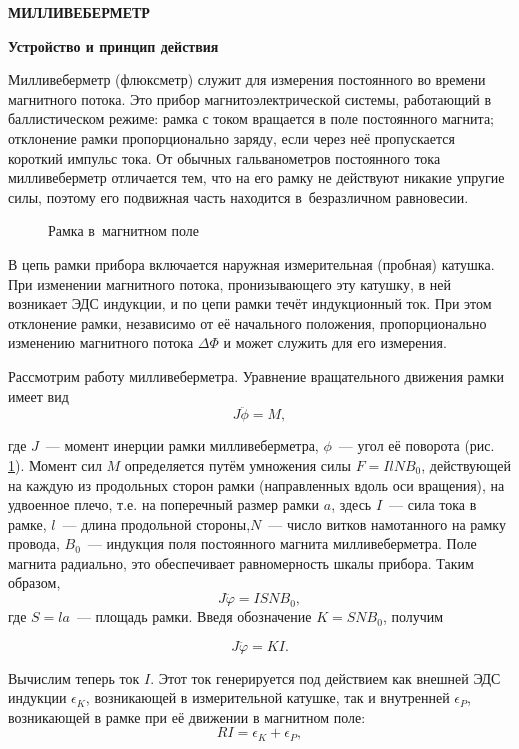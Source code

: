 \bigskip

\noindent\hfil{\large\bf  МИЛЛИВЕБЕРМЕТР}\label{MWB}

{\large\bf  Устройство и принцип действия}

Милливеберметр (флюксметр) служит для измерения постоянного во времени магнитного потока. Это прибор
магнитоэлектрической системы, работающий в баллистическом режиме: рамка с током вращается в поле постоянного магнита; отклонение рамки пропорционально заряду, если через неё пропускается короткий импульс тока. От обычных гальванометров постоянного тока милливеберметр отличается тем, что на его рамку не действуют никакие упругие силы, поэтому его подвижная часть находится в~безразличном равновесии.

\begin{figure}
\caption{Рамка в~магнитном поле}
\label{fig3.MWB.1}
\end{figure}

В цепь рамки прибора включается наружная измерительная (пробная) катушка. При изменении магнитного потока,
пронизывающего эту катушку, в ней возникает ЭДС индукции, и по цепи рамки течёт индукционный ток. При этом отклонение рамки, независимо от её начального положения, пропорционально изменению магнитного потока $\Delta\Phi$ и может служить для его измерения.

Рассмотрим работу милливеберметра. Уравнение вращательного движения рамки имеет вид
\begin{equation}
J\ddot{\phi}=M,
\label{fig3.MWB.1}
\end{equation}

где $J$~--- момент инерции рамки милливеберметра, $\phi$~--- угол её поворота (рис. \ref{fig3.MWB.1}). Момент сил $M$ определяется путём умножения силы $F=IlNB_0$, действующей на каждую из продольных сторон рамки (направленных вдоль оси вращения), на удвоенное плечо, т.е. на поперечный размер рамки $a$, здесь $I$~--- сила тока в рамке, $l$~--- длина продольной стороны,$N$~--- число витков намотанного на рамку провода, $B_0$~--- индукция поля постоянного магнита милливеберметра. Поле магнита радиально, это обеспечивает равномерность шкалы прибора. Таким образом,
$$
J\ddot{\varphi}=ISNB_0,
$$
где $S=la$~--- площадь рамки. Введя обозначение $K=SNB_0$, получим

\begin{equation}
J\ddot{\varphi}=KI.
\label{fig3.MWB.2}
\end{equation}

Вычислим теперь ток $I$. Этот ток генерируется под действием как внешней ЭДС индукции $\epsilon_K$, возникающей в измерительной катушке, так и внутренней $\epsilon_P$, возникающей в рамке при её движении в магнитном поле:
\begin{equation}
RI=\epsilon_K+\epsilon_P,
\label{fig3.MWB.3}
\end{equation}


